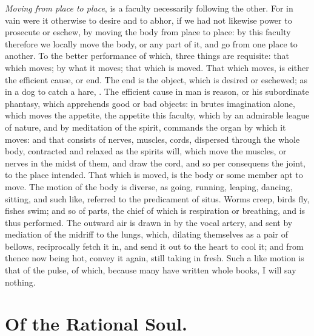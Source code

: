 {\emph{Moving from place to place}, is a faculty necessarily following the
other. For in vain were it otherwise to desire and to abhor, if we had
not likewise power to prosecute or eschew, by moving the body from
place to place: by this faculty therefore we locally move the body, or
any part of it, and go from one place to another. To the better
performance of which, three things are requisite: that which moves; by
what it moves; that which is moved. That which moves, is either the
efficient cause, or end. The end is the object, which is desired or
eschewed; as in a dog to catch a hare, \etc{}. The efficient cause in man
is reason, or his subordinate phantasy, which apprehends good or bad
objects: in brutes imagination alone, which moves the appetite, the
appetite this faculty, which by an admirable league of nature, and by
meditation of the spirit, commands the organ by which it moves: and
that consists of nerves, muscles, cords, dispersed through the whole
body, contracted and relaxed as the spirits will, which move the
muscles, or nerves in the midst of them, and draw the cord, and so
per consequens the joint, to the place intended. That which is moved,
is the body or some member apt to move. The motion of the body is
diverse, as going, running, leaping, dancing, sitting, and such like,
referred to the predicament of situs. Worms creep, birds fly, fishes
swim; and so of parts, the chief of which is respiration or breathing,
and is thus performed. The outward air is drawn in by the vocal artery,
and sent by mediation of the midriff to the lungs, which, dilating
themselves as a pair of bellows, reciprocally fetch it in, and send it
out to the heart to cool it; and from thence now being hot, convey it
again, still taking in fresh. Such a like motion is that of the pulse,
of which, because many have written whole books, I will say nothing.

\section{Of the Rational Soul.}

}
